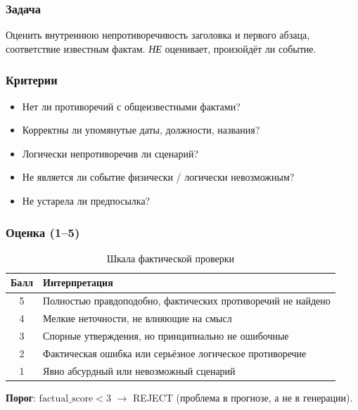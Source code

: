 \subsubsection{Задача}

Оценить внутреннюю непротиворечивость заголовка и первого абзаца, соответствие известным фактам. \emph{НЕ} оценивает, произойдёт ли событие.

\subsubsection{Критерии}

\begin{itemize}
  \item Нет ли противоречий с общеизвестными фактами?
  \item Корректны ли упомянутые даты, должности, названия?
  \item Логически непротиворечив ли сценарий?
  \item Не является ли событие физически / логически невозможным?
  \item Не устарела ли предпосылка?
\end{itemize}

\subsubsection{Оценка (1--5)}

\begin{table}[h]
  \centering
  \caption{Шкала фактической проверки}
  \label{tab:factual-score}
  \begin{tabular}{|c|l|}
    \hline
    \textbf{Балл} & \textbf{Интерпретация} \\
    \hline
    5 & Полностью правдоподобно, фактических противоречий не найдено \\
    \hline
    4 & Мелкие неточности, не влияющие на смысл \\
    \hline
    3 & Спорные утверждения, но принципиально не ошибочные \\
    \hline
    2 & Фактическая ошибка или серьёзное логическое противоречие \\
    \hline
    1 & Явно абсурдный или невозможный сценарий \\
    \hline
  \end{tabular}
\end{table}

\textbf{Порог}: $\text{factual\_score} < 3$ $\to$ REJECT (проблема в прогнозе, а не в генерации).

